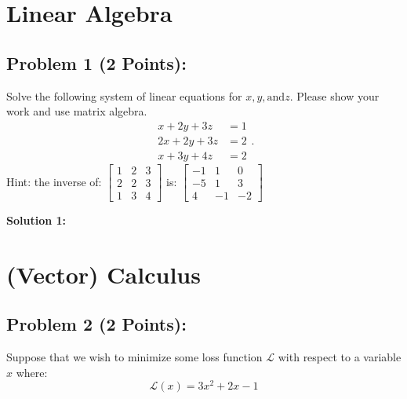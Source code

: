\documentclass[]{article}
\begin{document}
\section{Linear Algebra}

\subsection*{Problem 1 (2 Points):}
Solve the following system of linear equations for $x, y, \text{and} z$. Please show your work and use matrix algebra.
\begin{equation*}
    \begin{split}
        x + 2y + 3z &= 1 \\
        2x + 2y + 3z &= 2 \\
        x + 3y + 4z &= 2
    \end{split}.
\end{equation*}
Hint: the inverse of:
    $\begin{bmatrix}
        1 & 2 & 3\\
        2 & 2 & 3\\
        1 & 3 & 4
        \end{bmatrix}$
    is:
    $\begin{bmatrix}
        -1 & 1 & 0\\
        -5 & 1 & 3\\
        4 & -1 & -2
        \end{bmatrix}$

\bigskip
\textbf{Solution 1:}

\clearpage
\section{(Vector) Calculus}
\subsection*{Problem 2 (2 Points):}
Suppose that we wish to minimize some loss function $\mathcal{L}$ with respect to a variable $x$ where:
$$\mathcal{L}(x) = 3x^2 + 2x - 1$$
\end{document}
